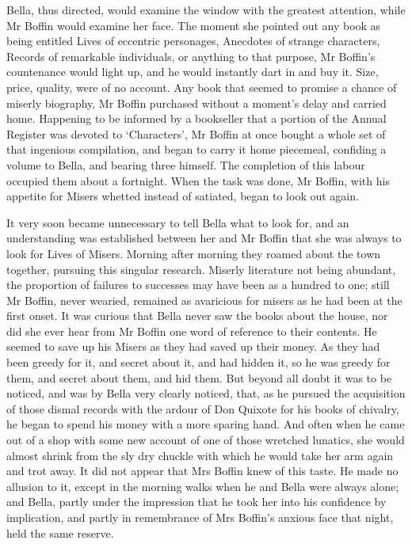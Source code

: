 Bella, thus directed, would examine the window with the greatest
attention, while Mr Boffin would examine her face. The moment she
pointed out any book as being entitled Lives of eccentric personages,
Anecdotes of strange characters, Records of remarkable individuals, or
anything to that purpose, Mr Boffin’s countenance would light up, and
he would instantly dart in and buy it. Size, price, quality, were of no
account. Any book that seemed to promise a chance of miserly biography,
Mr Boffin purchased without a moment’s delay and carried home. Happening
to be informed by a bookseller that a portion of the Annual Register was
devoted to ‘Characters’, Mr Boffin at once bought a whole set of that
ingenious compilation, and began to carry it home piecemeal, confiding
a volume to Bella, and bearing three himself. The completion of this
labour occupied them about a fortnight. When the task was done, Mr
Boffin, with his appetite for Misers whetted instead of satiated, began
to look out again.

It very soon became unnecessary to tell Bella what to look for, and an
understanding was established between her and Mr Boffin that she was
always to look for Lives of Misers. Morning after morning they roamed
about the town together, pursuing this singular research. Miserly
literature not being abundant, the proportion of failures to successes
may have been as a hundred to one; still Mr Boffin, never wearied,
remained as avaricious for misers as he had been at the first onset. It
was curious that Bella never saw the books about the house, nor did she
ever hear from Mr Boffin one word of reference to their contents. He
seemed to save up his Misers as they had saved up their money. As they
had been greedy for it, and secret about it, and had hidden it, so he
was greedy for them, and secret about them, and hid them. But beyond all
doubt it was to be noticed, and was by Bella very clearly noticed, that,
as he pursued the acquisition of those dismal records with the ardour of
Don Quixote for his books of chivalry, he began to spend his money with
a more sparing hand. And often when he came out of a shop with some new
account of one of those wretched lunatics, she would almost shrink from
the sly dry chuckle with which he would take her arm again and trot
away. It did not appear that Mrs Boffin knew of this taste. He made
no allusion to it, except in the morning walks when he and Bella were
always alone; and Bella, partly under the impression that he took her
into his confidence by implication, and partly in remembrance of Mrs
Boffin’s anxious face that night, held the same reserve.

